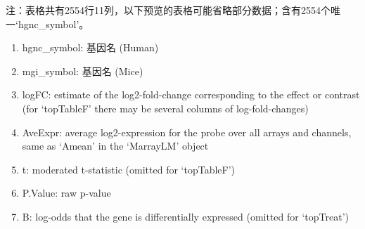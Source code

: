 \documentclass[
]{article}
\providecommand{\tightlist}{%
  \setlength{\itemsep}{0pt}\setlength{\parskip}{0pt}}
\begin{document}
\begin{center}\begin{tcolorbox}[colback=gray!10, colframe=gray!50, width=0.9\linewidth, arc=1mm, boxrule=0.5pt]注：表格共有2554行11列，以下预览的表格可能省略部分数据；含有2554个唯一`hgnc\_symbol'。
\end{tcolorbox}
\end{center}
\begin{center}\begin{tcolorbox}[colback=gray!10, colframe=gray!50, width=0.9\linewidth, arc=1mm, boxrule=0.5pt]\begin{enumerate}\tightlist
\item hgnc\_symbol:  基因名 (Human)
\item mgi\_symbol:  基因名 (Mice)
\item logFC:  estimate of the log2-fold-change corresponding to the effect or contrast (for ‘topTableF’ there may be several columns of log-fold-changes)
\item AveExpr:  average log2-expression for the probe over all arrays and channels, same as ‘Amean’ in the ‘MarrayLM’ object
\item t:  moderated t-statistic (omitted for ‘topTableF’)
\item P.Value:  raw p-value
\item B:  log-odds that the gene is differentially expressed (omitted for ‘topTreat’)
\end{enumerate}\end{tcolorbox}
\end{center}
\end{document}

